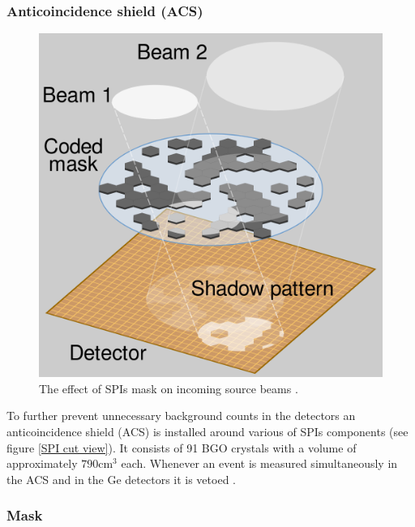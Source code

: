 \documentclass{report}
\begin{document}
\subsubsection*{Anticoincidence shield (ACS)}

\begin{figure}
  \vspace{-20pt}
  \includegraphics[width=\linewidth]{Images/General/HURA_hexagonal_coded_aperture_mask_principle.svg.png}
  \vspace{-20pt}
  \caption{The effect of SPIs mask on incoming source beams \cite{HURA}.}
  \vspace{-20pt}
  \label{HURA}
\end{figure}

To further prevent unnecessary background counts in the detectors an anticoincidence shield (ACS) is installed around various of SPIs components (see figure \ref{SPI cut view}). It consists of 91 BGO crystals with a volume of approximately $790\text{cm}^3$ each. Whenever an event is measured simultaneously in the ACS and in the Ge detectors it is vetoed \cite{refId0}. 



\subsubsection*{Mask}
\end{document}
